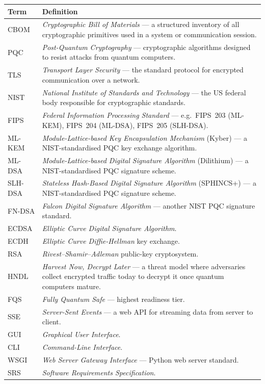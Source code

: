\begin{longtable}{L{3cm} L{11cm}}
  \toprule
  \textbf{Term} & \textbf{Definition} \\
  \midrule
  \endhead
  \bottomrule
  \endfoot
  CBOM     & \textit{Cryptographic Bill of Materials} — a structured inventory
             of all cryptographic primitives used in a system or communication
             session. \\
  PQC      & \textit{Post-Quantum Cryptography} — cryptographic algorithms
             designed to resist attacks from quantum computers. \\
  TLS      & \textit{Transport Layer Security} — the standard protocol for
             encrypted communication over a network. \\
  NIST     & \textit{National Institute of Standards and Technology} — the US
             federal body responsible for cryptographic standards. \\
  FIPS     & \textit{Federal Information Processing Standard} — e.g.\
             FIPS~203 (ML-KEM), FIPS~204 (ML-DSA), FIPS~205 (SLH-DSA). \\
  ML-KEM   & \textit{Module-Lattice-based Key Encapsulation Mechanism}
             (Kyber) — a NIST-standardised PQC key exchange algorithm. \\
  ML-DSA   & \textit{Module-Lattice-based Digital Signature Algorithm}
             (Dilithium) — a NIST-standardised PQC signature scheme. \\
  SLH-DSA  & \textit{Stateless Hash-Based Digital Signature Algorithm}
             (SPHINCS+) — a NIST-standardised PQC signature scheme. \\
  FN-DSA   & \textit{Falcon Digital Signature Algorithm} — another NIST
             PQC signature standard. \\
  ECDSA    & \textit{Elliptic Curve Digital Signature Algorithm}. \\
  ECDH     & \textit{Elliptic Curve Diffie-Hellman} key exchange. \\
  RSA      & \textit{Rivest–Shamir–Adleman} public-key cryptosystem. \\
  HNDL     & \textit{Harvest Now, Decrypt Later} — a threat model where
             adversaries collect encrypted traffic today to decrypt it once
             quantum computers mature. \\
  FQS      & \textit{Fully Quantum Safe} — highest readiness tier. \\
  SSE      & \textit{Server-Sent Events} — a web API for streaming data from
             server to client. \\
  GUI      & \textit{Graphical User Interface}. \\
  CLI      & \textit{Command-Line Interface}. \\
  WSGI     & \textit{Web Server Gateway Interface} — Python web server standard. \\
  SRS      & \textit{Software Requirements Specification}. \\
\end{longtable}

